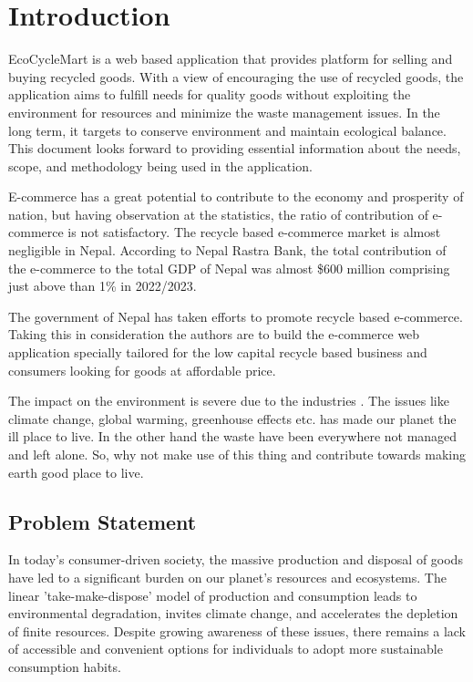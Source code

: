 \documentclass[12pt, a4paper, oneside]{article}
\begin{document}
\break

\cfoot{\textbf{\thepage} /  \pageref{LastPage}}


\section{Introduction} 
EcoCycleMart is a web based application that provides platform for selling and buying recycled goods. With a view of encouraging the use of recycled goods, the application  aims to fulfill needs for quality goods without exploiting the environment for resources and minimize the waste management issues. In the long term, it targets to conserve environment and maintain ecological balance. This document looks forward to providing essential information about the needs, scope, 
and methodology being used in the application.

E-commerce has a great potential to contribute to the economy and prosperity of nation, but having observation at the statistics, the ratio of contribution of e-commerce is not satisfactory. The recycle based e-commerce market is almost negligible in Nepal. According to Nepal Rastra Bank, the total contribution of the e-commerce to the total GDP of Nepal was almost \$600 million comprising just above than 1\% in 2022/2023.

The government of Nepal has taken efforts to promote recycle based e-commerce. Taking this in consideration the authors are to build the e-commerce web application specially tailored for the low capital recycle based business and consumers looking for goods at affordable price.

The impact on the environment is severe due to the industries . The issues like
climate change, global warming, greenhouse effects etc. has made our planet the ill place to live. In the other hand the waste have been everywhere not managed and left alone. So, why not make use of this thing and contribute towards making earth good place to live.


\pagebreak
\subsection{Problem Statement}
In today's consumer-driven society, the massive production and disposal of goods have led to a significant burden on our planet's resources and ecosystems. The linear 'take-make-dispose' model of production and consumption leads to environmental degradation, invites climate change, and accelerates the depletion of finite resources. Despite growing awareness of these issues, there remains a lack of accessible and convenient options for individuals to adopt more sustainable consumption habits.
\end{document}
